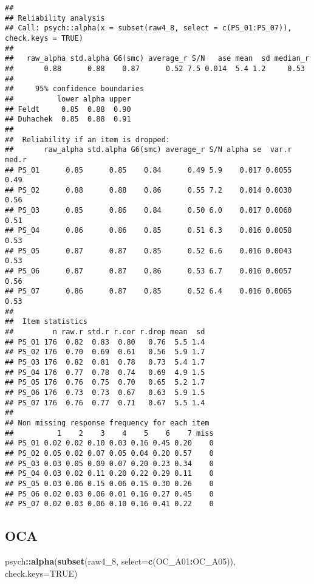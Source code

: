 \documentclass[
]{article}
\newenvironment{Shaded}{\begin{snugshade}}{\end{snugshade}}
\newcommand{\AttributeTok}[1]{\textcolor[rgb]{0.13,0.29,0.53}{#1}}
\newcommand{\ConstantTok}[1]{\textcolor[rgb]{0.56,0.35,0.01}{#1}}
\newcommand{\FunctionTok}[1]{\textcolor[rgb]{0.13,0.29,0.53}{\textbf{#1}}}
\newcommand{\NormalTok}[1]{#1}
\newcommand{\SpecialCharTok}[1]{\textcolor[rgb]{0.81,0.36,0.00}{\textbf{#1}}}
\begin{document}
\begin{verbatim}
## 
## Reliability analysis   
## Call: psych::alpha(x = subset(raw4_8, select = c(PS_01:PS_07)), check.keys = TRUE)
## 
##   raw_alpha std.alpha G6(smc) average_r S/N   ase mean  sd median_r
##       0.88      0.88    0.87      0.52 7.5 0.014  5.4 1.2     0.53
## 
##     95% confidence boundaries 
##          lower alpha upper
## Feldt     0.85  0.88  0.90
## Duhachek  0.85  0.88  0.91
## 
##  Reliability if an item is dropped:
##       raw_alpha std.alpha G6(smc) average_r S/N alpha se  var.r med.r
## PS_01      0.85      0.85    0.84      0.49 5.9    0.017 0.0055  0.49
## PS_02      0.88      0.88    0.86      0.55 7.2    0.014 0.0030  0.56
## PS_03      0.85      0.86    0.84      0.50 6.0    0.017 0.0060  0.51
## PS_04      0.86      0.86    0.85      0.51 6.3    0.016 0.0058  0.53
## PS_05      0.87      0.87    0.85      0.52 6.6    0.016 0.0043  0.53
## PS_06      0.87      0.87    0.86      0.53 6.7    0.016 0.0057  0.56
## PS_07      0.86      0.87    0.85      0.52 6.4    0.016 0.0065  0.53
## 
##  Item statistics 
##         n raw.r std.r r.cor r.drop mean  sd
## PS_01 176  0.82  0.83  0.80   0.76  5.5 1.4
## PS_02 176  0.70  0.69  0.61   0.56  5.9 1.7
## PS_03 176  0.82  0.81  0.78   0.73  5.4 1.7
## PS_04 176  0.77  0.78  0.74   0.69  4.9 1.5
## PS_05 176  0.76  0.75  0.70   0.65  5.2 1.7
## PS_06 176  0.73  0.73  0.67   0.63  5.9 1.5
## PS_07 176  0.76  0.77  0.71   0.67  5.5 1.4
## 
## Non missing response frequency for each item
##          1    2    3    4    5    6    7 miss
## PS_01 0.02 0.02 0.10 0.03 0.16 0.45 0.20    0
## PS_02 0.05 0.02 0.07 0.05 0.04 0.20 0.57    0
## PS_03 0.03 0.05 0.09 0.07 0.20 0.23 0.34    0
## PS_04 0.03 0.02 0.11 0.20 0.22 0.29 0.11    0
## PS_05 0.03 0.06 0.15 0.06 0.15 0.30 0.26    0
## PS_06 0.02 0.03 0.06 0.01 0.16 0.27 0.45    0
## PS_07 0.02 0.03 0.06 0.10 0.16 0.41 0.22    0
\end{verbatim}

\subsection{OCA}\label{oca}

\begin{Shaded}
\begin{Highlighting}[]
\NormalTok{psych}\SpecialCharTok{::}\FunctionTok{alpha}\NormalTok{(}\FunctionTok{subset}\NormalTok{(raw4\_8, }\AttributeTok{select=}\FunctionTok{c}\NormalTok{(OC\_A01}\SpecialCharTok{:}\NormalTok{OC\_A05)), }\AttributeTok{check.keys=}\ConstantTok{TRUE}\NormalTok{)}
\end{Highlighting}
\end{Shaded}
\end{document}
